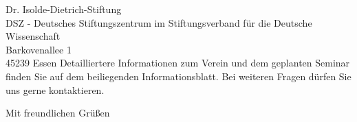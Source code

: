 \documentclass[../style/orpheus,fontsize=11pt]{scrlttr2}
\begin{document}
\begin{letter}{
\noindent Dr. Isolde-Dietrich-Stiftung \\
DSZ - Deutsches Stiftungszentrum im Stiftungsverband f\"ur die Deutsche Wissenschaft \\
Barkovenallee 1\\
45239 Essen
}
Detailliertere Informationen zum Verein und dem geplanten Seminar finden Sie auf dem beiliegenden Informationsblatt.  Bei weiteren Fragen  d\"urfen Sie uns gerne kontaktieren.





\closing{Mit freundlichen Gr\"u\ss en}


\end{letter}
\end{document}

